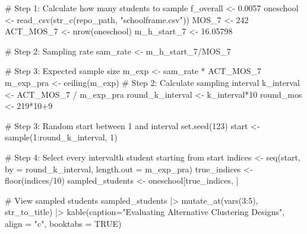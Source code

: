 \documentclass[
  12pt]{article}
\newenvironment{Shaded}{\begin{snugshade}}{\end{snugshade}}
\newcommand{\AttributeTok}[1]{\textcolor[rgb]{0.40,0.45,0.13}{#1}}
\newcommand{\CommentTok}[1]{\textcolor[rgb]{0.37,0.37,0.37}{#1}}
\newcommand{\ConstantTok}[1]{\textcolor[rgb]{0.56,0.35,0.01}{#1}}
\newcommand{\DecValTok}[1]{\textcolor[rgb]{0.68,0.00,0.00}{#1}}
\newcommand{\FloatTok}[1]{\textcolor[rgb]{0.68,0.00,0.00}{#1}}
\newcommand{\FunctionTok}[1]{\textcolor[rgb]{0.28,0.35,0.67}{#1}}
\newcommand{\NormalTok}[1]{\textcolor[rgb]{0.00,0.23,0.31}{#1}}
\newcommand{\OtherTok}[1]{\textcolor[rgb]{0.00,0.23,0.31}{#1}}
\newcommand{\SpecialCharTok}[1]{\textcolor[rgb]{0.37,0.37,0.37}{#1}}
\newcommand{\StringTok}[1]{\textcolor[rgb]{0.13,0.47,0.30}{#1}}
\begin{document}
\begin{Shaded}
\begin{Highlighting}[]
\CommentTok{\# Step 1:  Calculate how many students to sample}
\NormalTok{f\_overall }\OtherTok{\textless{}{-}} \FloatTok{0.0057}
\NormalTok{oneschool }\OtherTok{\textless{}{-}} \FunctionTok{read\_csv}\NormalTok{(}\FunctionTok{str\_c}\NormalTok{(repo\_path, }\StringTok{"schoolframe.csv"}\NormalTok{))}
\NormalTok{MOS\_7 }\OtherTok{\textless{}{-}} \DecValTok{242}
\NormalTok{ACT\_MOS\_7 }\OtherTok{\textless{}{-}} \FunctionTok{nrow}\NormalTok{(oneschool)}
\NormalTok{m\_h\_start\_7 }\OtherTok{\textless{}{-}} \FloatTok{16.05798}

\CommentTok{\# Step 2: Sampling rate}
\NormalTok{sam\_rate }\OtherTok{\textless{}{-}}\NormalTok{ m\_h\_start\_7}\SpecialCharTok{/}\NormalTok{MOS\_7}

\CommentTok{\# Step 3: Expected sample size}
\NormalTok{m\_exp }\OtherTok{\textless{}{-}}\NormalTok{ sam\_rate }\SpecialCharTok{*}\NormalTok{ ACT\_MOS\_7}
\NormalTok{m\_exp\_pra }\OtherTok{\textless{}{-}} \FunctionTok{ceiling}\NormalTok{(m\_exp)}
\CommentTok{\# Step 2: Calculate sampling interval}
\NormalTok{k\_interval }\OtherTok{\textless{}{-}}\NormalTok{ ACT\_MOS\_7 }\SpecialCharTok{/}\NormalTok{ m\_exp\_pra}
\NormalTok{round\_k\_interval }\OtherTok{\textless{}{-}}\NormalTok{ k\_interval}\SpecialCharTok{*}\DecValTok{10}
\NormalTok{round\_mos }\OtherTok{\textless{}{-}} \DecValTok{219}\SpecialCharTok{*}\DecValTok{10}\SpecialCharTok{+}\DecValTok{9}



\CommentTok{\# Step 3: Random start between 1 and interval}
\FunctionTok{set.seed}\NormalTok{(}\DecValTok{123}\NormalTok{)}
\NormalTok{start }\OtherTok{\textless{}{-}} \FunctionTok{sample}\NormalTok{(}\DecValTok{1}\SpecialCharTok{:}\NormalTok{round\_k\_interval, }\DecValTok{1}\NormalTok{)}

\CommentTok{\# Step 4: Select every \textasciigrave{}interval\textasciigrave{}{-}th student starting from \textasciigrave{}start\textasciigrave{}}
\NormalTok{indices }\OtherTok{\textless{}{-}} \FunctionTok{seq}\NormalTok{(start, }\AttributeTok{by =}\NormalTok{ round\_k\_interval, }\AttributeTok{length.out =}\NormalTok{ m\_exp\_pra)}
\NormalTok{true\_indices }\OtherTok{\textless{}{-}} \FunctionTok{floor}\NormalTok{(indices}\SpecialCharTok{/}\DecValTok{10}\NormalTok{)}
\NormalTok{sampled\_students }\OtherTok{\textless{}{-}}\NormalTok{ oneschool[true\_indices, ]}

\CommentTok{\# View sampled students}
\NormalTok{sampled\_students }\SpecialCharTok{|\textgreater{}} 
  \FunctionTok{mutate\_at}\NormalTok{(}\FunctionTok{vars}\NormalTok{(}\DecValTok{3}\SpecialCharTok{:}\DecValTok{5}\NormalTok{), str\_to\_title) }\SpecialCharTok{|\textgreater{}} 
  \FunctionTok{kable}\NormalTok{(}\AttributeTok{caption=}\StringTok{"Evaluating Alternative Clustering Designs"}\NormalTok{,}
        \AttributeTok{align =} \StringTok{"c"}\NormalTok{, }\AttributeTok{booktabs =} \ConstantTok{TRUE}\NormalTok{) }
\end{Highlighting}
\end{Shaded}
\end{document}
